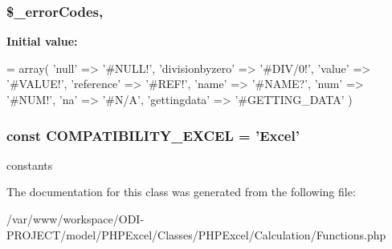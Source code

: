 \subsubsection[{\$\+\_\+error\+Codes}]{\setlength{\rightskip}{0pt plus 5cm}\$\+\_\+error\+Codes\hspace{0.3cm}{\ttfamily [static]}, {\ttfamily [protected]}}\label{class_p_h_p_excel___calculation___functions_ad94dacc140fbbe64c8ef1d177b22fbd8}
{\bfseries Initial value\+:}
\begin{DoxyCode}
= array( \textcolor{stringliteral}{'null'}             => \textcolor{stringliteral}{'#NULL!'},
                                             \textcolor{stringliteral}{'divisionbyzero'}   => \textcolor{stringliteral}{'#DIV/0!'},
                                             \textcolor{stringliteral}{'value'}            => \textcolor{stringliteral}{'#VALUE!'},
                                             \textcolor{stringliteral}{'reference'}        => \textcolor{stringliteral}{'#REF!'},
                                             \textcolor{stringliteral}{'name'}             => \textcolor{stringliteral}{'#NAME?'},
                                             \textcolor{stringliteral}{'num'}              => \textcolor{stringliteral}{'#NUM!'},
                                             \textcolor{stringliteral}{'na'}               => \textcolor{stringliteral}{'#N/A'},
                                             \textcolor{stringliteral}{'gettingdata'}      => \textcolor{stringliteral}{'#GETTING\_DATA'}
                                           )
\end{DoxyCode}
\subsubsection[{C\+O\+M\+P\+A\+T\+I\+B\+I\+L\+I\+T\+Y\+\_\+\+E\+X\+C\+E\+L}]{\setlength{\rightskip}{0pt plus 5cm}const C\+O\+M\+P\+A\+T\+I\+B\+I\+L\+I\+T\+Y\+\_\+\+E\+X\+C\+E\+L = 'Excel'}\label{class_p_h_p_excel___calculation___functions_ac4828906925d018afbe1ed96c01d6a9e}
constants 

The documentation for this class was generated from the following file\+:\begin{DoxyCompactItemize}
\item 
/var/www/workspace/\+O\+D\+I-\/\+P\+R\+O\+J\+E\+C\+T/model/\+P\+H\+P\+Excel/\+Classes/\+P\+H\+P\+Excel/\+Calculation/Functions.\+php\end{DoxyCompactItemize}
